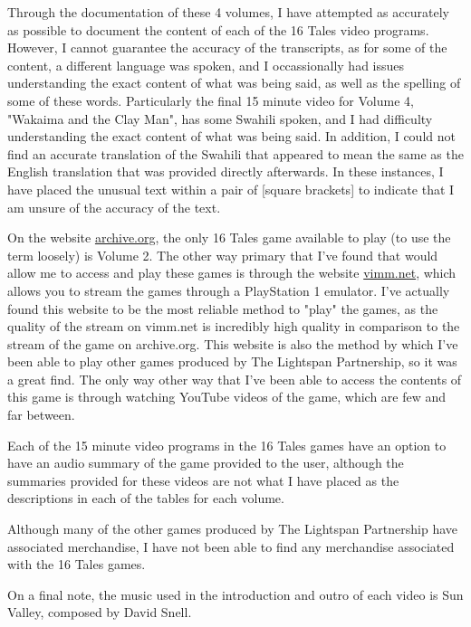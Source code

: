 Through the documentation of these 4 volumes, I have attempted as accurately as possible to document the content of each of the 16 Tales video programs.
However, I cannot guarantee the accuracy of the transcripts, as for some of the content, a different language was spoken, and I occassionally had issues understanding the exact content of what was being said, as well as the spelling of some of these words.
Particularly the final 15 minute video for Volume 4, "Wakaima and the Clay Man", has some Swahili spoken, and I had difficulty understanding the exact content of what was being said.
In addition, I could not find an accurate translation of the Swahili that appeared to mean the same as the English translation that was provided directly afterwards.
In these instances, I have placed the unusual text within a pair of [square brackets] to indicate that I am unsure of the accuracy of the text.

On the website \href{https://archive.org}{archive.org}, the only 16 Tales game available to play (to use the term loosely) is Volume 2.
The other way primary that I've found that would allow me to access and play these games is through the website \href{https://vimm.net}{vimm.net}, which allows you to stream the games through a PlayStation 1 emulator.
I've actually found this website to be the most reliable method to "play" the games, as the quality of the stream on vimm.net is incredibly high quality in comparison to the stream of the game on archive.org.
This website is also the method by which I've been able to play other games produced by The Lightspan Partnership, so it was a great find.
The only way other way that I've been able to access the contents of this game is through watching YouTube videos of the game, which are few and far between.

Each of the 15 minute video programs in the 16 Tales games have an option to have an audio summary of the game provided to the user, although the summaries provided for these videos are not what I have placed as the descriptions in each of the tables for each volume.

Although many of the other games produced by The Lightspan Partnership have associated merchandise, I have not been able to find any merchandise associated with the 16 Tales games.

On a final note, the music used in the introduction and outro of each video is Sun Valley, composed by David Snell.